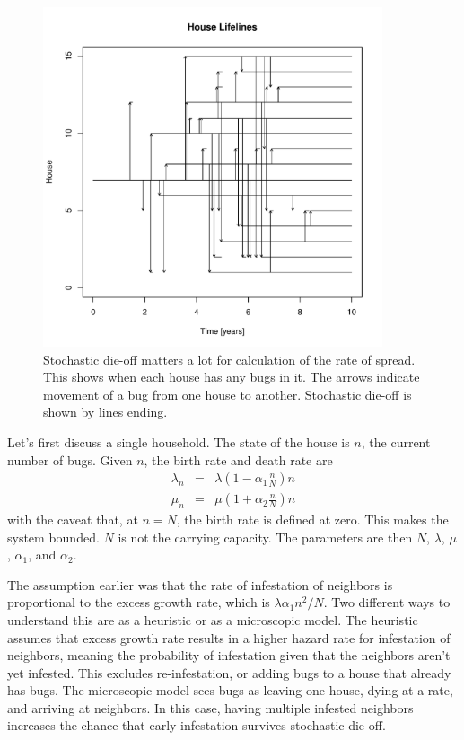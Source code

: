 \documentclass{article}
\begin{document}
\begin{figure}
\centerline{\includegraphics[width=10cm]{houselive.pdf}}
\caption{Stochastic die-off matters a lot for calculation of the
rate of spread. This shows when each house has any bugs in it.
The arrows indicate movement of a bug from one house to another.
Stochastic die-off is shown by lines ending.\label{fig:houselive}}
\end{figure}

Let's first discuss a single household.
The state of the house is $n$, the current number of bugs.
Given $n$, the birth rate and death rate are
\begin{eqnarray}
  \lambda_n & = & \lambda\left(1-\alpha_1\frac{n}{N}\right)n \\
  \mu_n & = & \mu\left(1+\alpha_2\frac{n}{N}\right)n
\end{eqnarray}
with the caveat that, at $n=N$, the birth rate is defined at zero.
This makes the system bounded. $N$ is not the carrying capacity.
The parameters are then $N$, $\lambda$, $\mu$, $\alpha_1$, and $\alpha_2$.

The assumption earlier was that the rate of infestation of
neighbors is proportional to the excess growth rate, which is
$\lambda\alpha_1n^2/N$. Two different ways to understand this
are as a heuristic or as a microscopic model. The heuristic assumes
that excess growth rate results in a higher hazard rate for infestation
of neighbors, meaning the probability of infestation given that the
neighbors aren't yet infested. This excludes re-infestation, or adding
bugs to a house that already has bugs. The microscopic model
sees bugs as leaving one house, dying at a rate, and arriving at neighbors.
In this case, having multiple infested neighbors increases the chance
that early infestation survives stochastic die-off.
\end{document}
